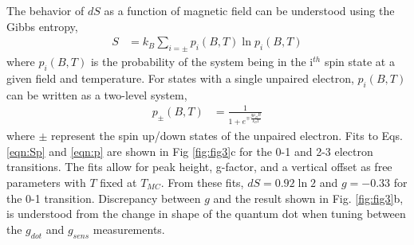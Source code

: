 \documentclass[twocolumn,showpacs,preprintnumbers,amsmath,amssymb,pra,aps,superscriptaddress]{revtex4-1}
\begin{document}
The behavior of $dS$ as a function of magnetic field can be understood using the Gibbs entropy,
%
\begin{align}
\label{eqn:Sp}
        S &= k_B \sum_{i=\pm} p_{i}(B, T) \ln{ p_{i}(B,T) }
\end{align}
%
where $p_{i}(B, T)$ is the probability of the system being in the i$^{th}$ spin state at a given field and temperature.  For states with a single unpaired electron, $p_{i}(B, T)$ can be written as a two-level system,
%
\begin{align}
\label{eqn:p}
        p_{\pm}(B, T) &= \frac{1}{1+ e^{\mp \frac{g\mu_B B}{k_B T}}}
\end{align}
%
where $\pm$ represent the spin up/down states of the unpaired electron. Fits to Eqs. \ref{eqn:Sp} and \ref{eqn:p} are shown in Fig \ref{fig:fig3}c for the 0-1 and 2-3 electron transitions. The fits allow for peak height, g-factor, and a vertical offset as free parameters with $T$ fixed at $T_{MC}$. From these fits, $dS=0.92 \ln{2}$ and $g=-0.33$ for the 0-1 transition.  Discrepancy between $g$ and the result shown in Fig. \ref{fig:fig3}b, is understood from the change in shape of the quantum dot when tuning between the $g_{dot}$ and $g_{sens}$ measurements.
\end{document}
